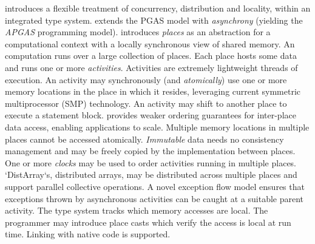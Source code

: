 {}\Xten{} introduces a flexible treatment of concurrency, distribution
and locality, within an integrated type system. \Xten{} extends the
PGAS model with {\em asynchrony} (yielding the {\em APGAS} programming
model). {}\Xten{} introduces {\em places} as an abstraction for a
computational context with a locally synchronous view of shared
memory. An \Xten{} computation runs over a large collection of places.
Each place hosts some data and runs one or more {\em
activities}. Activities are extremely lightweight threads of
execution. An activity may synchronously (and {\em atomically}) use
one or more memory locations in the place in which it resides,
leveraging current symmetric multiprocessor (SMP) technology.  
An activity may shift to another place to execute a statement block.
\Xten{} provides weaker ordering guarantees for
inter-place data access, enabling applications to scale.  
Multiple memory locations in multiple places cannot be
accessed atomically.  {\em
Immutable} data needs no consistency management and may be freely
copied by the implementation between places.  One or more {\em clocks}
may be used to order activities running in multiple
places.  \xcd`DistArray`s, distributed arrays,  may be distributed across
multiple 
places and  support parallel collective operations. A novel
exception flow model ensures that exceptions thrown by asynchronous
activities can be caught at a suitable parent activity.  The type
system tracks which memory accesses are local. The programmer may
introduce place casts which verify the access is local at run time.
Linking with native code is supported.



